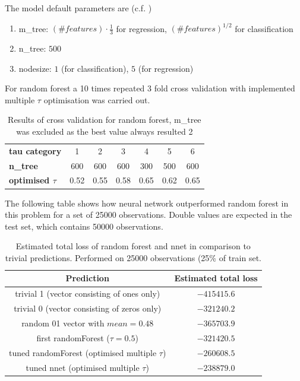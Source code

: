 \documentclass[a4paper,12pt]{article}
\begin{document}
The model default parameters are (c.f. \cite{breiman2001random})
\begin{enumerate}
\item m\_tree:  $(\#features) \cdot \frac{1}{3} $ for regression, $ (\#features)^{1/2}$ for classification
\item n\_tree:  $500$
\item nodesize: $1$ (for classification), $5$ (for regression)
\end{enumerate}

For random forest a 10 times repeated 3 fold cross validation with implemented multiple $\tau$ optimisation was carried out.

\begin{center}
\begin{table}[h]
\centering
\begin{tabular}{|l|| c | c | c | c | c | c |}
\hline
\textbf{tau category} & 1 & 2 & 3 & 4 & 5 & 6 \\
\textbf{n\_tree} & 600 & 600 & 600 & 300 & 500 & 600 \\
\textbf{optimised $\tau$} & 0.52 & 0.55 & 0.58 & 0.65 & 0.62 & 0.65 \\
\hline
\end{tabular}
 \caption{Results of cross validation for random forest, m\_tree was excluded as the best value always resulted 2}
 \label{Table::Moobs}
\end{table}
\end{center}
The following table shows how neural network outperformed random forest in this problem for a set of 25000 observations. Double values are expected in the test set, which contains 50000 observations.

\begin{table}[h]
\centering
\label{my-label}
\begin{tabular}{|cc|}
\hline
\textbf{Prediction} & \textbf{Estimated total loss} \\
\hline \hline
trivial 1 (vector consisting of ones only)                         &  $- 415415.6   $            \\
trivial 0 (vector consisting of zeros only)                       & $- 321240.2 $            \\
random 01 vector with $mean=0.48$                            &  $- 365703.9  $                \\
\hline
first randomForest ($\tau=0.5$)                                     & $- 321420.5$                \\
tuned randomForest (optimised multiple $\tau$)          &  $-260608.5$               \\
tuned nnet (optimised multiple $\tau$)                          & $-238879.0$                   \\
\hline
\end{tabular}
\caption{Estimated total loss of random forest and nnet in comparison to trivial predictions. Performed on 25000 observations (25\% of train set.}
\end{table}
\end{document}
